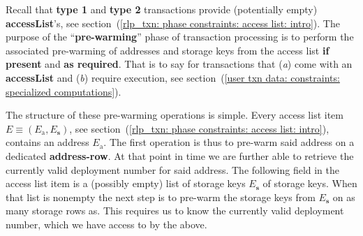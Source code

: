 Recall that \textbf{type 1} and \textbf{type 2} transactions provide (potentially empty) \textbf{accessList}'s,
see section~(\ref{rlp_txn: phase constraints: access list: intro}).
The purpose of the ``\textbf{pre-warming}'' phase of transaction processing is to perform the associated pre-warming of addresses and storage keys from the access list \textbf{if present} and \textbf{as required}.
That is to say for transactions that
(\emph{a}) come with an \textbf{accessList} and
(\emph{b}) require \evm{} execution,
see section~(\ref{user txn data: constraints: specialized computations}).

The structure of these pre-warming operations is simple.
Every access list item $E \equiv (E_\text{a}, E_\textbf{s})$,
see section~(\ref{rlp_txn: phase constraints: access list: intro}), contains an address $E_\text{a}$.
The first operation is thus to pre-warm said address on a dedicated \textbf{address-row}.
At that point in time we are further able to retrieve the currently valid deployment number for said address.
The following field in the access list item is a (possibly empty) list of storage keys $E_\textbf{s}$ of storage keys.
When that list is nonempty the next step is to pre-warm the storage keys from $E_\textbf{s}$ on as many storage rows as.
This requires us to know the currently valid deployment number, which we have access to by the above.
